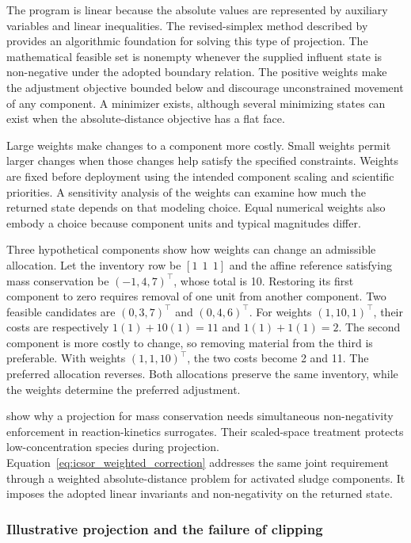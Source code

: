 The program is linear because the absolute values are represented by auxiliary variables and linear inequalities. The revised-simplex method described by \citet{HuangfuHall2018} provides an algorithmic foundation for solving this type of projection. The mathematical feasible set is nonempty whenever the supplied influent state is non-negative under the adopted boundary relation. The positive weights make the adjustment objective bounded below and discourage unconstrained movement of any component. A minimizer exists, although several minimizing states can exist when the absolute-distance objective has a flat face.

Large weights make changes to a component more costly. Small weights permit larger changes when those changes help satisfy the specified constraints. Weights are fixed before deployment using the intended component scaling and scientific priorities. A sensitivity analysis of the weights can examine how much the returned state depends on that modeling choice. Equal numerical weights also embody a choice because component units and typical magnitudes differ.

Three hypothetical components show how weights can change an admissible allocation. Let the inventory row be \([1\ \ 1\ \ 1]\) and the affine reference satisfying mass conservation be \((-1,4,7)^\top\), whose total is 10. Restoring its first component to zero requires removal of one unit from another component. Two feasible candidates are \((0,3,7)^\top\) and \((0,4,6)^\top\). For weights \((1,10,1)^\top\), their costs are respectively \(1(1)+10(1)=11\) and \(1(1)+1(1)=2\). The second component is more costly to change, so removing material from the third is preferable. With weights \((1,1,10)^\top\), the two costs become 2 and 11. The preferred allocation reverses. Both allocations preserve the same inventory, while the weights determine the preferred adjustment.

\citet{KircherVotsmeier2025} show why a projection for mass conservation needs simultaneous non-negativity enforcement in reaction-kinetics surrogates. Their scaled-space treatment protects low-concentration species during projection. Equation~\eqref{eq:icsor_weighted_correction} addresses the same joint requirement through a weighted absolute-distance problem for activated sludge components. It imposes the adopted linear invariants and non-negativity on the returned state.

\subsubsection{Illustrative projection and the failure of clipping}

